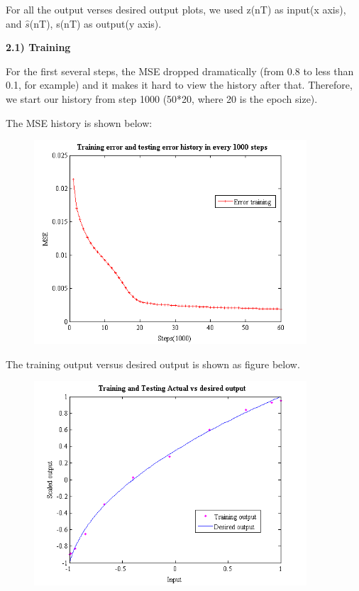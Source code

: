 \documentclass[epsfig]{article}
\def\bpar{\vskip26pt}
\def\npar{\vskip13pt}
\begin{document}
For all the output verses desired output plots, we used z(nT) as input(x axis), and $\hat{s}$(nT), s(nT) as output(y axis). 

\clearpage
{\bf 
\npar
2.1) Training
\bpar
}

For the first several steps, the MSE dropped dramatically (from 0.8 to less than 0.1, for example) and it makes it hard to view the history after that. Therefore, we start our history from step 1000 (50*20, where 20 is the epoch size).  

The MSE history is shown below:

\begin{figure}[!htb] 
\centering\includegraphics[width=4in]{MSEhistory_1.png} 
\end{figure} 

The training output versus desired output is shown as figure below.

\begin{figure}[!htb] 
\centering\includegraphics[width=4in]{TrainvsDesire_1.png} 
\end{figure} 
\end{document}
